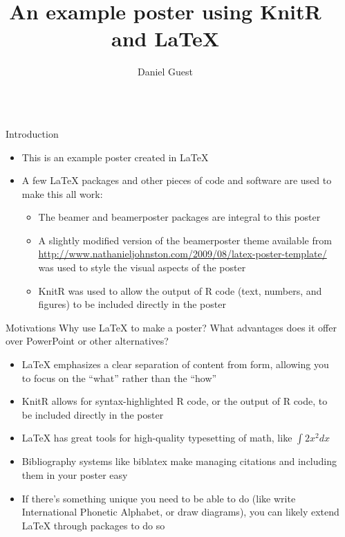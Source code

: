 \documentclass[final]{beamer}\usepackage[]{graphicx}\usepackage[]{color}
\title{An example poster using KnitR and LaTeX}
\author{Daniel Guest}
\institute{University of Somewhere, Department of Something, One of the Labs}
\newlength{\sepwid}
\newlength{\onecolwid}
\begin{document}
\begin{frame}[t, fragile]
	\begin{columns}[T] %
		\begin{column}{\sepwid}\end{column} %
		\begin{column}{\onecolwid} %
				\begin{block}{Introduction}
						\begin{itemize}
							\item This is an example poster created in \LaTeX{}
							\item A few \LaTeX{} packages and other pieces of code and software are used to make this all work:
							\begin{itemize}
								\item The beamer and beamerposter packages are integral to this poster
								\item A slightly modified version of the beamerposter theme available from \url{http://www.nathanieljohnston.com/2009/08/latex-poster-template/} was used to style the visual aspects of the poster
								\item KnitR was used to allow the output of R code (text, numbers, and figures) to be included directly in the poster
							\end{itemize}
						\end{itemize}
				\end{block}
				\begin{alertblock}{Motivations}
						Why use \LaTeX{} to make a poster? What advantages does it offer over PowerPoint or other alternatives?
						\begin{itemize}
								\item LaTeX{} emphasizes a clear separation of content from form, allowing you to focus on the ``what'' rather than the ``how'' 
								\item KnitR allows for syntax-highlighted R code, or the output of R code, to be included directly in the poster 
								\item LaTeX{} has great tools for high-quality typesetting of math, like $\int 2x^2 dx$
								\item Bibliography systems like biblatex make managing citations and including them in your poster easy
								\item If there's something unique you need to be able to do (like write International Phonetic Alphabet, or draw diagrams), you can likely extend \LaTeX{} through packages to do so

\end{itemize}
\end{alertblock}
\end{column}
\end{columns}
\end{frame}
\end{document}
